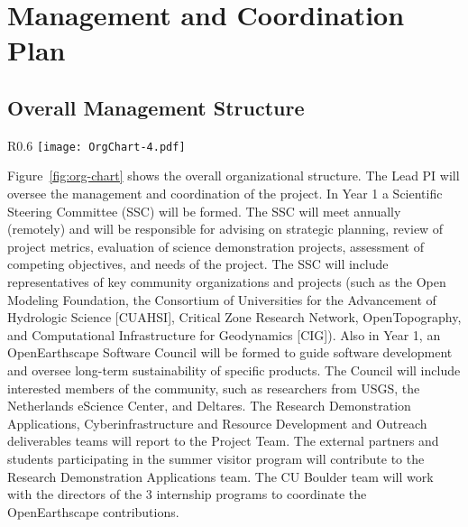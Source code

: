 \section*{Management and Coordination Plan}


 \subsection*{Overall Management Structure}
 \begin{wrapfigure}{R}{0.6\textwidth}
  \texttt{[image: OrgChart-4.pdf]}
  \caption{Organizational structure for proposed project.}
  \label{fig:org-chart}
\end{wrapfigure}

Figure~\ref{fig:org-chart} shows the overall organizational structure. The Lead PI will oversee the management and coordination of the project.  In Year 1 a Scientific Steering Committee (SSC) will be formed. The SSC will meet annually (remotely) and will be responsible for advising on strategic planning, review of project metrics, evaluation of science demonstration projects, assessment of competing objectives, and needs of the project.  The SSC will include representatives of key community organizations and projects (such as the Open Modeling Foundation, the Consortium of Universities for the Advancement of Hydrologic Science [CUAHSI], Critical Zone Research Network, OpenTopography, and Computational Infrastructure for Geodynamics [CIG]).  Also in Year 1, an OpenEarthscape Software Council will be formed to guide software development and oversee long-term sustainability of specific products.  The Council will include interested members of the community, such as researchers from USGS, the Netherlands eScience Center, and Deltares. The Research Demonstration Applications, Cyberinfrastructure and Resource Development and Outreach deliverables teams will report to the Project Team.  The external partners and students participating in the summer visitor program will contribute to the Research Demonstration Applications team. The CU Boulder team will work with the directors of the 3 internship programs to coordinate the OpenEarthscape contributions.

